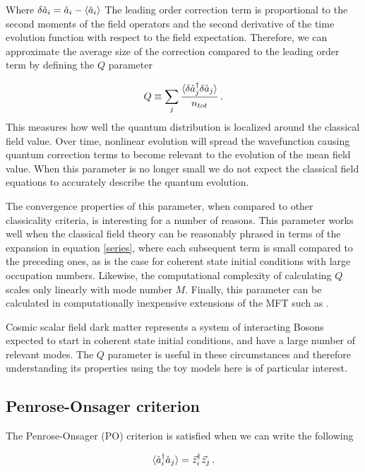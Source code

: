 \documentclass[aps,prd,twocolumn,superscriptaddress]{revtex4-1}
\begin{document}
Where $\delta \hat a_i = \hat a_i - \braket{\hat a_i}$ The leading order correction term is proportional to the second moments of the field operators and the second derivative of the time evolution function with respect to the field expectation. Therefore, we can approximate the average size of the correction compared to the leading order term by defining the $Q$ parameter

\begin{align} \label{Qparam}
    Q \equiv \sum_j \frac{\braket{\delta \hat a_j^\dagger \delta \hat a_j}}{n_{tot}} \, .
\end{align}
This measures how well the quantum distribution is localized around the classical field value. Over time, nonlinear evolution will spread the wavefunction causing quantum correction terms to become relevant to the evolution of the mean field value. When this parameter is no longer small we do not expect the classical field equations to accurately describe the quantum evolution. 

The convergence properties of this parameter, when compared to other classicality criteria, is interesting for a number of reasons. This parameter works well when the classical field theory can be reasonably phrased in terms of the expansion in equation \eqref{series}, where each subsequent term is small compared to the preceding ones, as is the case for coherent state initial conditions with large occupation numbers. Likewise, the computational complexity of calculating $Q$ scales only linearly with mode number $M$. Finally, this parameter can be calculated in computationally inexpensive extensions of the MFT such as \cite{Eberhardt2021}. 

Cosmic scalar field dark matter represents a system of interacting Bosons expected to start in coherent state initial conditions, and have a large number of relevant modes. The $Q$ parameter is useful in these circumstances and therefore understanding its properties using the toy models here is of particular interest. 

\subsection{Penrose-Onsager criterion}

The Penrose-Onsager (PO) criterion is satisfied when we can write the following \cite{Penrose1956}

\begin{equation} \label{POcriterion}
    \braket{\hat a^\dagger_i \hat a_j} = \vec{z}_i^\dagger \vec z_j \, .
\end{equation}
\end{document}
